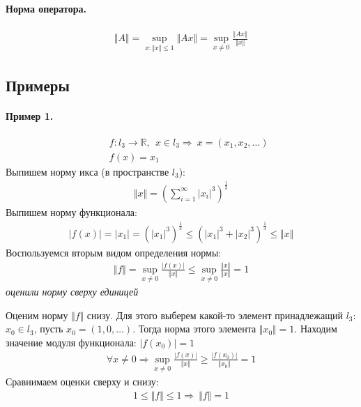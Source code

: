 \documentclass{article}[12pt]
\newcommand{\R}{\mathbb{R}}
\begin{document}
\paragraph{Норма оператора.}
\begin{eqnarray*}
    \Vert A \Vert
    =\sup_{x:\Vert x \Vert \leqslant 1}\Vert Ax \Vert
    =\sup_{x\neq 0}\frac{\Vert Ax \Vert}{\Vert x \Vert }
\end{eqnarray*}
\subsection{Примеры}
\paragraph{Пример 1.}
\begin{eqnarray*}
&&f:l_{3}\to\R,\ \ x\in l_{3} \Rightarrow\ x=(x_{1},x_{2},\ldots)\\
&&f(x)=x_{1}
\end{eqnarray*}
Выпишем норму икса (в пространстве $l_{3}$):
\begin{eqnarray*}
    \Vert x \Vert
    =\left(\sum\limits_{i=1}^{\infty}|x_{i}|^{3}\right)^{\frac{1}{3}}
\end{eqnarray*}
Выпишем норму функционала:
\begin{eqnarray*}
    |f(x)|=|x_{1}|=\left(|x_{1}|^{3}\right)^{\frac{1}{3}}
    \leqslant \left(|x_{1}|^{3}+|x_{2}|^{3}\right)^{\frac{1}{3}}
    \leqslant \Vert x \Vert
\end{eqnarray*}
Воспользуемся вторым видом определения нормы:
\begin{eqnarray*}
    \Vert f \Vert =\sup_{x\neq 0}\frac{|f(x)|}{\Vert x \Vert}
    \leqslant \sup_{x\neq 0}\frac{\Vert x \Vert}{\Vert x \Vert}=1
\end{eqnarray*}
\textit{оценили норму сверху единицей}
\par Оценим норму $\Vert f \Vert$ снизу. Для этого выберем какой-то
элемент принадлежащий $l_{3}$: $x_{0}\in l_{3}$, пусть
$x_{0}=(1,0,\ldots)$. Тогда норма этого элемента $\Vert x_{0} \Vert =1$.
Находим значение модуля функционала: $|f(x_{0})|=1$
\begin{eqnarray*}
    \forall x\neq 0 \Rightarrow \sup_{x\neq 0}\frac{|f(x)|}{\Vert x \Vert}
    \geqslant \frac{|f(x_{0})|}{\Vert x_{0} \Vert}=1
\end{eqnarray*}
Сравнимаем оценки сверху и снизу:
\begin{eqnarray*}
1\leqslant \Vert f \Vert \leqslant 1
\Rightarrow\ \Vert f \Vert =1
\end{eqnarray*}
\end{document}
